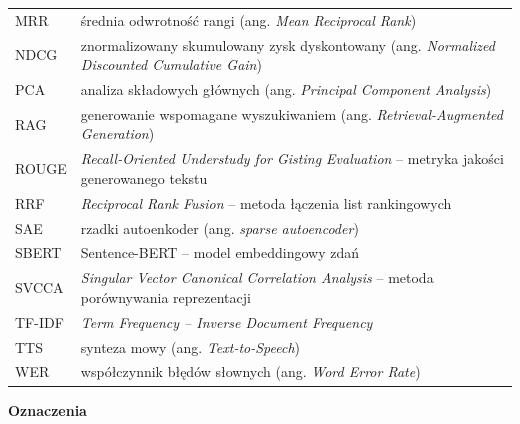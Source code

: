 \begin{longtable}{@{}p{2.6cm}p{\dimexpr\linewidth-2.6cm-2\tabcolsep\relax}@{}}
MRR & średnia odwrotność rangi (ang. \textit{Mean Reciprocal Rank}) \\
NDCG & znormalizowany skumulowany zysk dyskontowany (ang. \textit{Normalized Discounted Cumulative Gain}) \\
PCA & analiza składowych głównych (ang. \textit{Principal Component Analysis}) \\
RAG & generowanie wspomagane wyszukiwaniem (ang. \textit{Retrieval-Augmented Generation}) \\
ROUGE & \textit{Recall-Oriented Understudy for Gisting Evaluation} -- metryka jakości generowanego tekstu \\
RRF & \textit{Reciprocal Rank Fusion} -- metoda łączenia list rankingowych \\
SAE & rzadki autoenkoder (ang. \textit{sparse autoencoder}) \\
SBERT & Sentence-BERT -- model embeddingowy zdań \\
SVCCA & \textit{Singular Vector Canonical Correlation Analysis} -- metoda porównywania reprezentacji \\
TF-IDF & \textit{Term Frequency -- Inverse Document Frequency} \\
TTS & synteza mowy (ang. \textit{Text-to-Speech}) \\
WER & współczynnik błędów słownych (ang. \textit{Word Error Rate}) \\
\end{longtable}

\newpage

\noindent\textbf{Oznaczenia}

